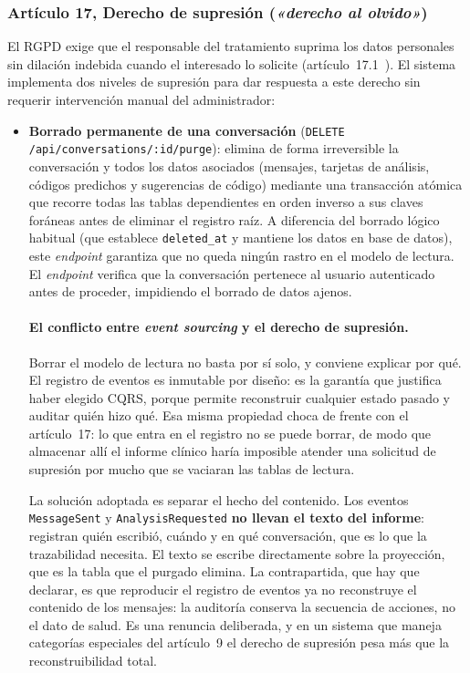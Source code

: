 \subsubsection{Artículo 17, Derecho de supresión (\emph{«derecho al olvido»})}

El RGPD exige que el responsable del tratamiento suprima los datos personales sin dilación indebida cuando el interesado lo solicite (artículo~17.1~\cite{RGPD16}). El sistema implementa dos niveles de supresión para dar respuesta a este derecho sin requerir intervención manual del administrador:

\begin{itemize}
 \item \textbf{Borrado permanente de una conversación} (\texttt{DELETE /api/conversations/:id/purge}): elimina de forma irreversible la conversación y todos los datos asociados (mensajes, tarjetas de análisis, códigos predichos y sugerencias de código) mediante una transacción atómica que recorre todas las tablas dependientes en orden inverso a sus claves foráneas antes de eliminar el registro raíz. A diferencia del borrado lógico habitual (que establece \texttt{deleted\_at} y mantiene los datos en base de datos), este \emph{endpoint} garantiza que no queda ningún rastro en el modelo de lectura. El \emph{endpoint} verifica que la conversación pertenece al usuario autenticado antes de proceder, impidiendo el borrado de datos ajenos.

\paragraph{El conflicto entre \emph{event sourcing} y el derecho de supresión.}
Borrar el modelo de lectura no basta por sí solo, y conviene explicar por qué. El registro de eventos es inmutable por diseño: es la garantía que justifica haber elegido CQRS, porque permite reconstruir cualquier estado pasado y auditar quién hizo qué. Esa misma propiedad choca de frente con el artículo~17: lo que entra en el registro no se puede borrar, de modo que almacenar allí el informe clínico haría imposible atender una solicitud de supresión por mucho que se vaciaran las tablas de lectura.

La solución adoptada es separar el hecho del contenido. Los eventos \texttt{MessageSent} y \texttt{AnalysisRequested} \textbf{no llevan el texto del informe}: registran quién escribió, cuándo y en qué conversación, que es lo que la trazabilidad necesita. El texto se escribe directamente sobre la proyección, que es la tabla que el purgado elimina. La contrapartida, que hay que declarar, es que reproducir el registro de eventos ya no reconstruye el contenido de los mensajes: la auditoría conserva la secuencia de acciones, no el dato de salud. Es una renuncia deliberada, y en un sistema que maneja categorías especiales del artículo~9 el derecho de supresión pesa más que la reconstruibilidad total.


\end{itemize}
